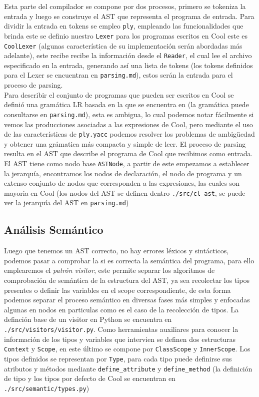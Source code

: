 \documentclass{article}
\begin{document}
Esta parte del compilador se compone por dos procesos, primero se tokeniza la entrada y luego se construye el AST que representa el programa de entrada. Para dividir la entrada en tokens se empleo \verb|ply|, empleando las funcionalidades que brinda este se definio nuestro \verb|Lexer| para los programas escritos en Cool este es \verb|CoolLexer| (algunas caracter\'istica de su implementaci\'on ser\'an abordadas m\'as adelante), este recibe recibe la informaci\'on desde el \verb|Reader|, el cual lee el archivo especificado en la entrada, generando as\'i una lista de tokens (los tokens definidos para el Lexer se encuentran en \verb|parsing.md|), estos ser\'an la entrada para el proceso de parsing.\\

Para describir el conjunto de programas que pueden ser escritos en Cool se defini\'o una gram\'atica LR basada en la que se encuentra en \cite{1} (la gram\'atica puede consultarse en \verb|parsing.md|), esta es ambigua, lo cual podemos notar f\'acilmente si vemos las producciones asociadas a las expresiones de Cool, pero mediante el uso de las caracter\'isticas de \verb|ply.yacc| podemos resolver los problemas de ambig\"uedad y obtener una gr\'amatica m\'as compacta y simple de leer. El proceso de parsing resulta en el AST que describe el programa de Cool que recibimos como entrada. El AST tiene como nodo base \verb|ASTNode|, a partir de este empezamos a establecer la jerarqu\'ia, encontramos los nodos de declaraci\'on, el nodo de programa y un extenso conjunto de nodos que corresponden a las expresiones, las cuales son mayoria en Cool (los nodos del AST se definen dentro \verb|./src/cl_ast|, se puede ver la jerarqu\'ia del AST en \verb|parsing.md|)

\subsection{An\'alisis Sem\'antico}

Luego que tenemos un AST correcto, no hay errores l\'exicos y sint\'acticos, podemos pasar a comprobar la si es correcta la sem\'antica del programa, para ello emplearemos el \textit{patr\'on visitor}, este permite separar los algoritmos de comprobaci\'on de sem\'antica de la estructura del AST, ya sea recolectar los tipos presentes o definir las variables en el scope correspondiente, de esta forma podemos separar el proceso sem\'antico en diversas fases m\'as simples y enfocadas algunas en nodos en particulas como es el caso de la recolecci\'on de tipos. La definci\'on base de un visitor en Python se encuentra en \verb|./src/visitors/visitor.py|. Como herramientas auxiliares para conocer la informaci\'on de los tipos y variables que intervien se definen dos estructuras \verb|Context| y \verb|Scope|, en este \'ultimo se compone por \verb|ClassScope| y \verb|InnerScope|. Los tipos definidos se representan por \verb|Type|, para cada tipo puede definirse sus atributos y m\'etodos mediante \verb|define_attribute| y \verb|define_method| (la definici\'on de tipo y los tipos por defecto de Cool se encuentran en \verb|./src/semantic/types.py|)
\end{document}
